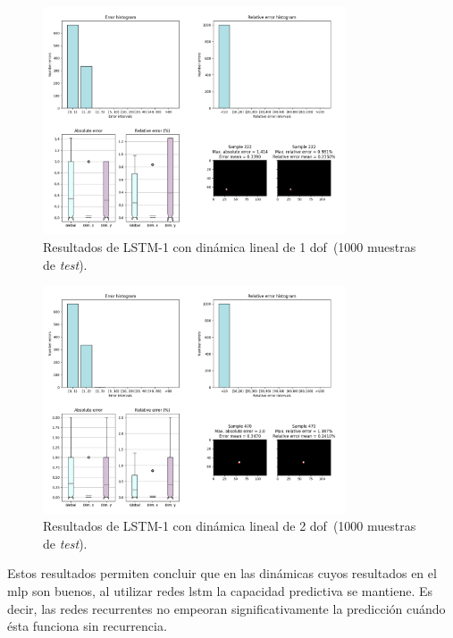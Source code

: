 \begin{figure}[H]
		\begin{center}
			\includegraphics[width=0.8\textwidth]{ figures/test_mod/REC/simple/linear_fix_10000.png}
			\caption{Resultados de LSTM-1 con dinámica lineal de 1 \acrshort{dof}~(1000 muestras de \textit{test}).} 
			\label{fig.rec_lin_fix_10000}
		\end{center}
\end{figure}

\begin{figure}[H]
		\begin{center}
			\includegraphics[width=0.8\textwidth]{ figures/test_mod/REC/simple/linear_var_10000.png}
			\caption{Resultados de LSTM-1 con dinámica lineal de 2 \acrshort{dof}~(1000 muestras de \textit{test}).}
			\label{fig.rec_lin_var_10000}
		\end{center}
\end{figure}
\vspace{-10pt}

Estos resultados permiten concluir que en las dinámicas cuyos resultados en el \acrshort{mlp} son buenos, al utilizar redes \acrshort{lstm} la capacidad predictiva se mantiene. Es decir, las redes recurrentes no empeoran significativamente la predicción cuándo ésta funciona sin recurrencia.

